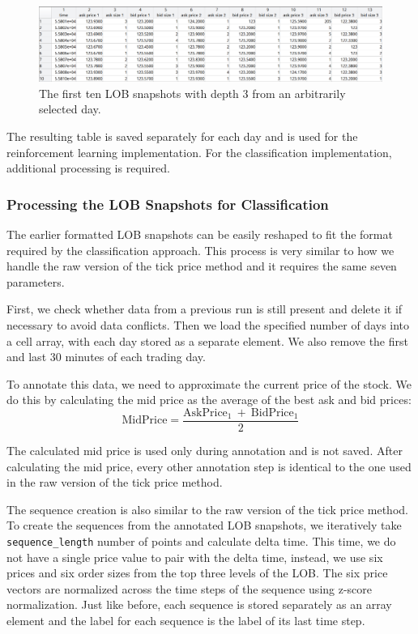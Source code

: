 \documentclass[a4paper,oneside,onecolumn,12pt]{book}
\begin{document}
			\begin{figure}[H]
			\begin{center}
				\includegraphics[width=\linewidth]{kep/formatted_lob.png}
				\caption{The first ten LOB snapshots with depth 3 from an arbitrarily selected day.}
				\label{fig:formatted_lob}
			\end{center}
			\end{figure}

			The resulting table is saved separately for each day and is used for the reinforcement learning implementation. For the classification implementation, additional processing is required.

		\subsubsection{Processing the LOB Snapshots for Classification}
		The earlier formatted LOB snapshots can be easily reshaped to fit the format required by the classification approach. This process is very similar to how we handle the raw version of the tick price method and it requires the same seven parameters.

		First, we check whether data from a previous run is still present and delete it if necessary to avoid data conflicts. Then we load the specified number of days into a cell array, with each day stored as a separate element. We also remove the first and last 30 minutes of each trading day.

		To annotate this data, we need to approximate the current price of the stock. We do this by calculating the mid price as the average of the best ask and bid prices:
		\[
		\text{MidPrice} = \frac{\text{AskPrice}_{1}\ +\ \text{BidPrice}_{1}}{2}
		\]

		The calculated mid price is used only during annotation and is not saved. After calculating the mid price, every other annotation step is identical to the one used in the raw version of the tick price method.

		The sequence creation is also similar to the raw version of the tick price method. To create the sequences from the annotated LOB snapshots, we iteratively take \texttt{sequence\_length} number of points and calculate delta time. This time, we do not have a single price value to pair with the delta time, instead, we use six prices and six order sizes from the top three levels of the LOB. The six price vectors are normalized across the time steps of the sequence using z-score normalization. Just like before, each sequence is stored separately as an array element and the label for each sequence is the label of its last time step.
\end{document}
